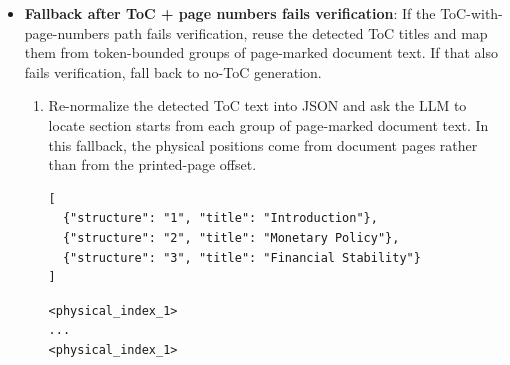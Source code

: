 \documentclass[11pt,a4paper]{article}
\newcommand{\fieldname}[1]{\textcolor{red!70!black}{\texttt{#1}}}
\begin{document}
\begin{enumerate}
\begin{itemize}
\begin{enumerate}[label=(\alph*)]
\begin{lstlisting}[style=pageTextBlockInList]
-> answer: "yes"
\end{lstlisting}
            \item Check whether each accepted section starts at the beginning of its page and store \fieldname{appear\_start}.
\begin{lstlisting}[style=pageTextBlockInList]
[
  {"structure": "1", "title": "Introduction",
   "physical_index": 1, "appear_start": "yes"},
  {"structure": "2", "title": "Financial Stability",
   "physical_index": 21, "appear_start": "yes"}
]
\end{lstlisting}
            \item Convert the verified flat list into the nested PageIndex tree. This is rules-based: \fieldname{physical\_index} becomes \fieldname{start\_index}, \fieldname{end\_index} is derived from the next section start, and \fieldname{structure} controls nesting.
\begin{lstlisting}[style=pageTextBlockInList]
[
  {"title": "Introduction", "start_index": 1,
   "end_index": 20},
  {"title": "Financial Stability", "start_index": 21,
   "end_index": 31}
]
\end{lstlisting}
        \end{enumerate}
        \item \textbf{Fallback after ToC + page numbers fails verification}: If the ToC-with-page-numbers path fails verification, reuse the detected ToC titles and map them from token-bounded groups of page-marked document text. If that also fails verification, fall back to no-ToC generation.
        \begin{enumerate}[label=(\alph*)]
            \item Re-normalize the detected ToC text into JSON and ask the LLM to locate section starts from each group of page-marked document text. In this fallback, the physical positions come from document pages rather than from the printed-page offset.
\begin{lstlisting}[style=pageTextBlockInList]
[
  {"structure": "1", "title": "Introduction"},
  {"structure": "2", "title": "Monetary Policy"},
  {"structure": "3", "title": "Financial Stability"}
]
\end{lstlisting}
\begin{lstlisting}[style=pageTextBlockInList]
<physical_index_1>
...
<physical_index_1>


\end{lstlisting}
\end{enumerate}
\end{itemize}
\end{enumerate}
\end{document}
